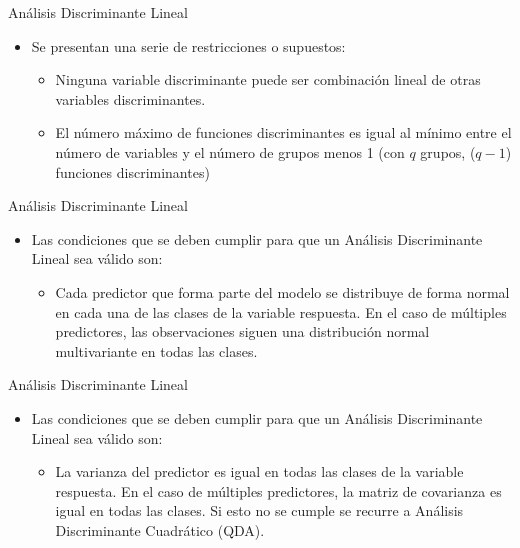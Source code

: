 \documentclass[ignorenonframetext,]{beamer}
\providecommand{\tightlist}{%
  \setlength{\itemsep}{0pt}\setlength{\parskip}{0pt}}
\begin{document}
\begin{frame}{Análisis Discriminante Lineal}

\begin{itemize}
\item
  Se presentan una serie de restricciones o supuestos:

  \begin{itemize}
  \tightlist
  \item
    Ninguna variable discriminante puede ser combinación lineal de otras
    variables discriminantes.
  \item
    El número máximo de funciones discriminantes es igual al mínimo
    entre el número de variables y el número de grupos menos 1 (con
    \(q\) grupos, (\(q-1\)) funciones discriminantes)
  \end{itemize}
\end{itemize}

\end{frame}

\begin{frame}{Análisis Discriminante Lineal}

\begin{itemize}
\item
  Las condiciones que se deben cumplir para que un Análisis
  Discriminante Lineal sea válido son:

  \begin{itemize}
  \tightlist
  \item
    Cada predictor que forma parte del modelo se distribuye de forma
    normal en cada una de las clases de la variable respuesta. En el
    caso de múltiples predictores, las observaciones siguen una
    distribución normal multivariante en todas las clases.
  \end{itemize}
\end{itemize}

\end{frame}

\begin{frame}{Análisis Discriminante Lineal}

\begin{itemize}
\item
  Las condiciones que se deben cumplir para que un Análisis
  Discriminante Lineal sea válido son:

  \begin{itemize}
  \tightlist
  \item
    La varianza del predictor es igual en todas las clases de la
    variable respuesta. En el caso de múltiples predictores, la matriz
    de covarianza es igual en todas las clases. Si esto no se cumple se
    recurre a Análisis Discriminante Cuadrático (QDA).
  \end{itemize}
\end{itemize}

\end{frame}
\end{document}

